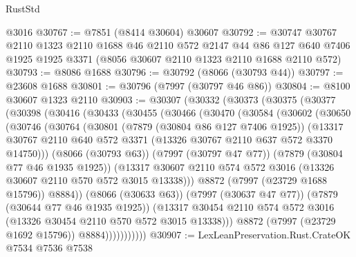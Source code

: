\begin{lexlean}{RustStd}
\begin{coremodule}
    @3016
@30767 := @7851 (@8414 @30604) @30607
@30792 := @30747
    @30767
    @2110
    @1323
    @2110
    @1688
    @46
    @2110
    @572
    @2147
    @44
    @86
    @127
    @640
    @7406
    @1925
    @1925
    @3371
    (@8056 @30607 @2110 @1323 @2110 @1688 @2110 @572)
@30793 := @8086 @1688
@30796 := @30792 (@8066 (@30793 @44))
@30797 := @23608 @1688
@30801 := @30796 (@7997 (@30797 @46 @86))
@30804 := @8100 @30607 @1323 @2110
@30903 := @30307
    (@30332
      (@30373
        (@30375
          (@30377
            (@30398
              (@30416
                (@30433
                  (@30455
                    (@30466
                      (@30470
                        (@30584
                          (@30602
                            (@30650
                              (@30746
                                (@30764
                                  (@30801
                                    (@7879 (@30804 @86 @127 @7406 @1925))
                                    (@13317
                                      @30767
                                      @2110
                                      @640
                                      @572
                                      @3371
                                      (@13326 @30767 @2110 @637 @572 @3370 @14750)))
                                  (@8066 (@30793 @63))
                                  (@7997 (@30797 @47 @77))
                                  (@7879 (@30804 @77 @46 @1935 @1925))
                                  (@13317
                                    @30607
                                    @2110
                                    @574
                                    @572
                                    @3016
                                    (@13326 @30607 @2110 @570 @572 @3015 @13338)))
                                @8872
                                (@7997 (@23729 @1688 @15796))
                                @8884))
                            (@8066 (@30633 @63))
                            (@7997 (@30637 @47 @77))
                            (@7879 (@30644 @77 @46 @1935 @1925))
                            (@13317
                              @30454
                              @2110
                              @574
                              @572
                              @3016
                              (@13326 @30454 @2110 @570 @572 @3015 @13338)))
                          @8872
                          (@7997 (@23729 @1692 @15796))
                          @8884)))))))))))
@30907 := LexLeanPreservation.Rust.CrateOK @7534 @7536 @7538

\end{coremodule}
\end{lexlean}
